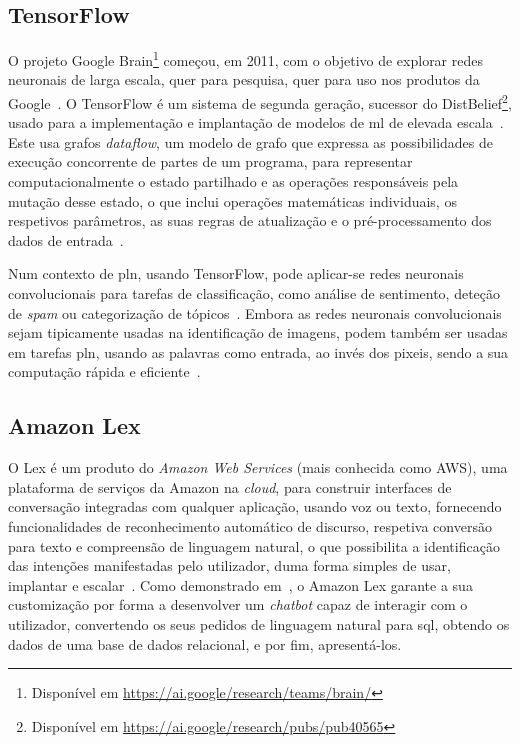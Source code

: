 \subsection{TensorFlow}
O projeto Google Brain\footnote{Disponível em \url{https://ai.google/research/teams/brain/}} começou, em 2011, com o objetivo de explorar redes neuronais de larga escala, quer para pesquisa, quer para uso nos produtos da Google~\parencite{tensorflow_largescale_machine_learning_distributed_systems}. O TensorFlow é um sistema de segunda geração, sucessor do DistBelief\footnote{Disponível em \url{https://ai.google/research/pubs/pub40565}}, usado para a implementação e implantação de modelos de \gls{ml} de elevada escala~\parencite{tensorflow_largescale_machine_learning_distributed_systems}. Este usa grafos \textit{dataflow}, um modelo de grafo que expressa as possibilidades de execução concorrente de partes de um programa, para representar computacionalmente o estado partilhado e as operações responsáveis pela mutação desse estado, o que inclui operações matemáticas individuais, os respetivos parâmetros, as suas regras de atualização e o pré-processamento dos dados de entrada~\parencite{data_flow_graphs_encyclopedia_parellel_computing, tensorflow_system_largescale_machine_learning}.

Num contexto de \gls{pln}, usando TensorFlow, pode aplicar-se redes neuronais convolucionais para tarefas de classificação, como análise de sentimento, deteção de \textit{spam} ou categorização de tópicos~\parencite{understanding_convolution_neural_networks_nlp}. Embora as redes neuronais convolucionais sejam tipicamente usadas na identificação de imagens, podem também ser usadas em tarefas \gls{pln}, usando as palavras como entrada, ao invés dos pixeis, sendo a sua computação rápida e eficiente~\parencite{understanding_convolution_neural_networks_nlp}.

\subsection{Amazon Lex}
O Lex é um produto do \textit{Amazon Web Services} (mais conhecida como AWS), uma plataforma de serviços da Amazon na \textit{cloud}, para construir interfaces de conversação integradas com qualquer aplicação, usando voz ou texto, fornecendo funcionalidades de reconhecimento automático de discurso, respetiva conversão para texto e compreensão de linguagem natural, o que possibilita a identificação das intenções manifestadas pelo utilizador, duma forma simples de usar, implantar e escalar~\parencite{amazon_lex_official}. Como demonstrado em~\textcite{aws_ml_blog_conversational_business}, o Amazon Lex garante a sua customização por forma a desenvolver um \textit{chatbot} capaz de interagir com o utilizador, convertendo os seus pedidos de linguagem natural para \gls{sql}, obtendo os dados de uma base de dados relacional, e por fim, apresentá-los.

